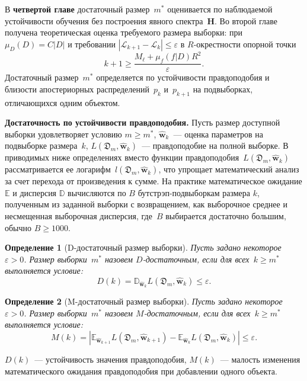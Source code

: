 \documentclass{dissert}
\newcommand{\paragraph}[1]{\noindent\textbf{#1}\quad}
\newtheorem{definition}{Определение}
\begin{document}
В \textbf{четвертой главе} достаточный размер~$m^*$ оценивается по наблюдаемой устойчивости обучения без построения явного спектра~$\mathbf{H}$. Во второй главе получена теоретическая оценка требуемого размера выборки: при~$\mu_D(D)=C|D|$ и требовании $|\mathcal{L}_{k+1}-\mathcal{L}_k|\le\varepsilon$ в $R$-окрестности опорной точки
\[
    k+1 \ge \frac{M_\ell+\mu_f(f|D)R^2}{\varepsilon}.
\]
Достаточный размер~$m^*$ определяется по устойчивости правдоподобия и близости апостериорных распределений~$p_k$ и~$p_{k+1}$ на подвыборках, отличающихся одним объектом.

\paragraph{Достаточность по устойчивости правдоподобия.}
Пусть размер доступной выборки удовлетворяет условию $m\geqslant m^*$, $\hat{\mathbf{w}}_k$~--- оценка параметров на подвыборке размера~$k$, $L(\mathfrak{D}_m,\hat{\mathbf{w}}_k)$~--- правдоподобие на полной выборке. В приводимых ниже определениях вместо функции правдоподобия~$L(\mathfrak{D}_m,\hat{\mathbf{w}}_{k})$ рассматривается ее логарифм~$l(\mathfrak{D}_m,\hat{\mathbf{w}}_{k})$, что упрощает математический анализ за счет перехода от произведения к сумме.
На практике математическое ожидание $\mathbb{E}$ и дисперсия $\mathbb{D}$ вычисляются по $B$ бутстрэп-подвыборкам размера $k$, полученным из заданной выборки с возвращением, как выборочное среднее и несмещенная выборочная дисперсия, где~$B$ выбирается достаточно большим, обычно $B\geqslant 1000$.

\begin{definition}[D-достаточный размер выборки]
Пусть задано некоторое~$\varepsilon > 0$.
Размер выборки~$m^*$ назовем $D$-достаточным, если для всех~$k\geqslant m^*$ выполняется условие:
\[
    D(k) = \mathbb{D}_{\hat{\mathbf{w}}_{k}} L(\mathfrak{D}_m, \hat{\mathbf{w}}_{k}) \leqslant \varepsilon.
\]
\end{definition}

\begin{definition}[M-достаточный размер выборки]
Пусть задано некоторое~$\varepsilon > 0$.
Размер выборки~$m^*$ назовем $M$-достаточным, если для всех~$k\geqslant m^*$ выполняется условие:
\[
    M(k) = \left| \mathbb{E}_{\hat{\mathbf{w}}_{k+1}} L(\mathfrak{D}_m, \hat{\mathbf{w}}_{k+1}) - \mathbb{E}_{\hat{\mathbf{w}}_{k}} L(\mathfrak{D}_m, \hat{\mathbf{w}}_{k}) \right| \leqslant \varepsilon.
\]
\end{definition}
$D(k)$~--- устойчивость значения правдоподобия, $M(k)$~--- малость изменения математического ожидания правдоподобия при добавлении одного объекта.
\end{document}
